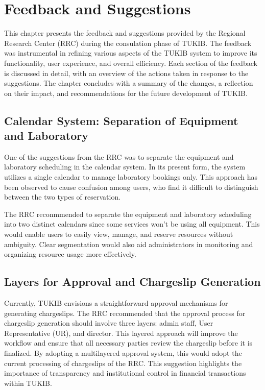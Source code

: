 \chapter{Feedback and Suggestions}
This chapter presents the feedback and suggestions provided by the Regional Research Center (RRC) during the consulation phase of TUKIB. The feedback was instrumental in refining various aspects of the TUKIB system to improve its functionality, user experience, and overall efficiency. Each section of the feedback is discussed in detail, with an overview of the actions taken in response to the suggestions. The chapter concludes with a summary of the changes, a reflection on their impact, and recommendations for the future development of TUKIB.

\section{Calendar System: Separation of Equipment and Laboratory}
One of the suggestions from the RRC was to separate the equipment and laboratory scheduling in the calendar system. In its present form, the system utilizes a single calendar to manage laboratory bookings only. This approach has been observed to cause confusion among users, who find it difficult to distinguish between the two types of reservation.

The RRC reconmmended to separate the equipment and laboratory scheduling into two distinct calendars since some services won't be using all equipment. This would enable users to easily view, manage, and reserve resources without ambiguity. Clear segmentation would also aid administrators in monitoring and organizing resource usage more effectively.

\section{Layers for Approval and Chargeslip Generation}
Currently, TUKIB envisions a straightforward approval mechanisms for generating chargeslips. The RRC recommended that the approval process for chargeslip generation should involve three layers: admin staff, User Representative (UR), and director. This layered approach will improve the workflow and ensure that all necessary parties review the chargeslip before it is finalized. By adopting a multilayered approval system, this would adopt the current processing of chargeslips of the RRC. This suggestion highlights the importance of transparency and institutional control in financial transactions within TUKIB.

